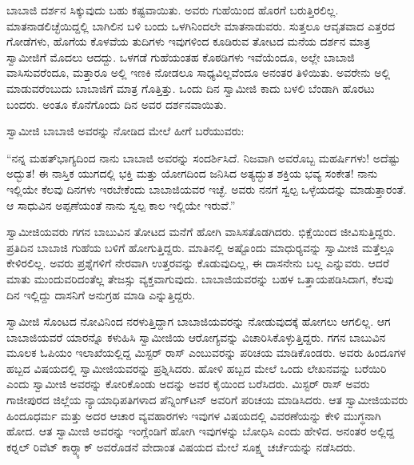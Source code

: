  ಬಾಬಾಜಿ ದರ್ಶನ ಸಿಕ್ಕುವುದು ಬಹು ಕಷ್ಟವಾಯಿತು. ಅವರು ಗುಹೆಯಿಂದ ಹೊರಗೆ ಬರುತ್ತಿರಲಿಲ್ಲ. ಮಾತನಾಡಲಿಚ್ಛೆಯಿದ್ದಲ್ಲಿ ಬಾಗಿಲಿನ ಬಳಿ ಬಂದು ಒಳಗಿನಿಂದಲೇ ಮಾತನಾಡುವರು. ಸುತ್ತಲೂ ಆವೃತವಾದ ಎತ್ತರದ ಗೋಡೆಗಳು, ಹೊಗೆಯ ಕೊಳವೆಯ ತುದಿಗಳು ಇವುಗಳಿಂದ ಕೂಡಿರುವ ತೋಟದ ಮನೆಯ ದರ್ಶನ ಮಾತ್ರ ಸ್ವಾಮೀಜಿಗೆ ಮೊದಲು ಆದದ್ದು. ಒಳಗಡೆ ಗುಹೆಯಂತಹ ಕೊಠಡಿಗಳು ಇವೆಯೆಂದೂ, ಅಲ್ಲೇ ಬಾಬಾಜಿ ವಾಸಿಸುವರೆಂದೂ, ಮತ್ತಾರೂ ಅಲ್ಲಿ ಇಣಕಿ ನೋಡಲೂ ಸಾಧ್ಯವಿಲ್ಲವೆಂದೂ ಅನಂತರ ತಿಳಿಯಿತು. ಅವರೇನು ಅಲ್ಲಿ ಮಾಡುವರೆಂಬುದು ಬಾಬಾಜಿಗೆ ಮಾತ್ರ ಗೊತ್ತಿತ್ತು. ಒಂದು ದಿನ ಸ್ವಾಮೀಜಿ ಕಾದು ಬಳಲಿ ಬೆಂಡಾಗಿ ಹೊರಟು ಬಂದರು. ಅಂತೂ ಕೊನೆಗೊಂದು ದಿನ ಅವರ ದರ್ಶನವಾಯಿತು. 

 ಸ್ವಾಮೀಜಿ ಬಾಬಾಜಿ ಅವರನ್ನು ನೋಡಿದ ಮೇಲೆ ಹೀಗೆ ಬರೆಯುವರು: 

 “ನನ್ನ ಮಹತ್‍ಭಾಗ್ಯದಿಂದ ನಾನು ಬಾಬಾಜಿ ಅವರನ್ನು ಸಂದರ್ಶಿಸಿದೆ. ನಿಜವಾಗಿ ಅವರೊಬ್ಬ ಮಹರ್ಷಿಗಳು! ಅದೆಷ್ಟು ಅದ್ಭುತ! ಈ ನಾಸ್ತಿಕ ಯುಗದಲ್ಲಿ ಭಕ್ತಿ ಮತ್ತು ಯೋಗದಿಂದ ಜನಿಸಿದ ಅತ್ಯದ್ಭುತ ಶಕ್ತಿಯ ಭವ್ಯ ಸಂಕೇತ! ನಾನು ಇಲ್ಲಿಯೇ ಕೆಲವು ದಿನಗಳು ಇರಬೇಕೆಂದು ಬಾಬಾಜಿಯವರ ಇಚ್ಛೆ. ಅವರು ನನಗೆ ಸ್ವಲ್ಪ ಒಳ್ಳೆಯದನ್ನು ಮಾಡುತ್ತಾರಂತೆ. ಆ ಸಾಧುವಿನ ಅಪ್ಪಣೆಯಂತೆ ನಾನು ಸ್ವಲ್ಪ ಕಾಲ ಇಲ್ಲಿಯೇ ಇರುವೆ.” 

 ಸ್ವಾಮೀಜಿಯವರು ಗಗನ ಬಾಬುವಿನ ತೋಟದ ಮನೆಗೆ ಹೋಗಿ ವಾಸಿಸತೊಡಗಿದರು. ಭಿಕ್ಷೆಯಿಂದ ಜೀವಿಸುತ್ತಿದ್ದರು. ಪ್ರತಿದಿನ ಬಾಬಾಜಿ ಗುಹೆಯ ಬಳಿಗೆ ಹೋಗುತ್ತಿದ್ದರು. ಮಾತಿನಲ್ಲಿ ಅಷ್ಟೊಂದು ಮಾಧುರ‍್ಯವನ್ನು ಸ್ವಾಮೀಜಿ ಮತ್ತೆಲ್ಲೂ ಕೇಳಿರಲಿಲ್ಲ. ಅವರು ಪ್ರಶ್ನೆಗಳಿಗೆ ನೇರವಾಗಿ ಉತ್ತರವನ್ನು ಕೊಡುವುದಿಲ್ಲ, ಈ ದಾಸನೇನು ಬಲ್ಲ ಎನ್ನುವರು. ಆದರೆ ಮಾತು ಮುಂದುವರಿದಂತೆಲ್ಲ ತೇಜಸ್ಸು ವ್ಯಕ್ತವಾಗುವುದು. ಬಾಬಾಜಿಯವರನ್ನು ಬಹಳ ಒತ್ತಾಯಪಡಿಸಿದಾಗ, ಕೆಲವು ದಿನ ಇಲ್ಲಿದ್ದು ದಾಸನಿಗೆ ಅನುಗ್ರಹ ಮಾಡಿ ಎನ್ನುತ್ತಿದ್ದರು. 

 ಸ್ವಾಮೀಜಿ ಸೊಂಟದ ನೋವಿನಿಂದ ನರಳುತ್ತಿದ್ದಾಗ ಬಾಬಾಜಿಯವರನ್ನು ನೋಡುವುದಕ್ಕೆ ಹೋಗಲು ಆಗಲಿಲ್ಲ. ಆಗ ಬಾಬಾಜಿಯವರೆ ಯಾರನ್ನೊ ಕಳುಹಿಸಿ ಸ್ವಾಮೀಜಿಯ ಆರೋಗ್ಯವನ್ನು ವಿಚಾರಿಸಿಕೊಳ್ಳುತ್ತಿದ್ದರು. ಗಗನ ಬಾಬುವಿನ ಮೂಲಕ ಓಪಿಯಂ ಇಲಾಖೆಯಲ್ಲಿದ್ದ ಮಿಸ್ಟರ್ ರಾಸ್ ಎಂಬುವರನ್ನು ಪರಿಚಯ ಮಾಡಿಕೊಂಡರು. ಅವರು ಹಿಂದೂಗಳ ಹಬ್ಬದ ವಿಷಯದಲ್ಲಿ ಸ್ವಾಮೀಜಿಯವರನ್ನು ಪ್ರಶ್ನಿಸಿದರು. ಹೋಳಿ ಹಬ್ಬದ ಮೇಲೆ ಒಂದು ಲೇಖನವನ್ನು ಬರೆಯಿರಿ ಎಂದು ಸ್ವಾಮೀಜಿ ಅವರನ್ನು ಕೋರಿಕೊಂಡು ಅದನ್ನು ಅವರ ಕೈಯಿಂದ ಬರೆಸಿದರು. ಮಿಸ್ಟರ್ ರಾಸ್ ಅವರು ಗಾಜೀಪುರದ ಜಿಲ್ಲೆಯ ನ್ಯಾಯಾಧಿಪತಿಗಳಾದ ಪೆನ್ನಿಂಗ್‍ಟನ್ ಅವರಿಗೆ ಪರಿಚಯ ಮಾಡಿಸಿದರು. ಆತ ಸ್ವಾಮೀಜಿಯವರು ಹಿಂದೂಧರ್ಮ ಮತ್ತು ಅದರ ಆಚಾರ ವ್ಯವಹಾರಗಳು ಇವುಗಳ ವಿಷಯದಲ್ಲಿ ವಿವರಣೆಯನ್ನು ಕೇಳಿ ಮುಗ್ಧನಾಗಿ ಹೋದ. ಆತ ಸ್ವಾಮೀಜಿ ಅವರನ್ನು ಇಂಗ್ಲೆಂಡಿಗೆ ಹೋಗಿ ಇವುಗಳನ್ನು ಬೋಧಿಸಿ ಎಂದು ಹೇಳಿದ. ಅನಂತರ ಅಲ್ಲಿದ್ದ ಕರ‍್ನಲ್ ರಿವೆಟ್ ಕಾರ‍್ನ್ಯಾಕ್ ಅವರೊಡನೆ ವೇದಾಂತ ವಿಷಯದ ಮೇಲೆ ಸೂಕ್ಷ್ಮ ಚರ್ಚೆಯನ್ನು ನಡೆಸಿದರು. 

